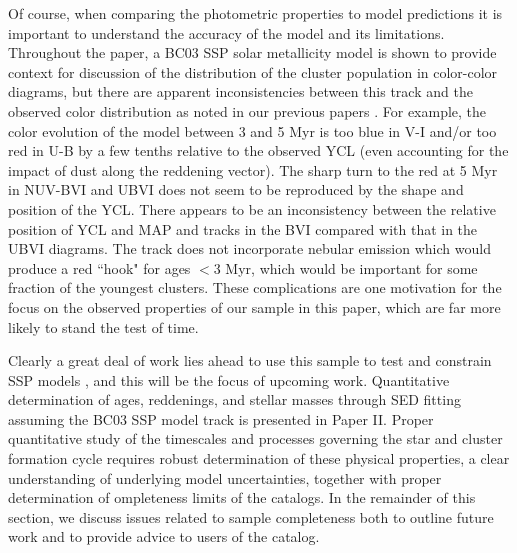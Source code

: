 \documentclass[linenumbers]{aastex63}
\begin{document}
 Of course, when comparing the photometric properties to model predictions it is important to understand the accuracy of the model and its limitations. Throughout the paper, a BC03 SSP solar metallicity model is shown to provide context for discussion of the distribution of the cluster population in color-color diagrams, but there are apparent inconsistencies between this track and the observed color distribution as noted in our previous papers \citep[e.g.,][]{turner_phangs-hst_2021, deger_bright_2022}.  For example, the color evolution of the model between 3 and 5 Myr is too blue in V-I and/or too red in U-B by a few tenths relative to the observed YCL (even accounting for the impact of dust along the reddening vector).  The sharp turn to the red at 5 Myr in NUV-BVI and UBVI does not seem to be reproduced by the shape and position of the YCL.   There appears to be an inconsistency between the relative position of YCL and MAP and tracks in the BVI compared with that in the UBVI diagrams.  The track does not incorporate nebular emission which would produce a red ``hook" for ages $<$3 Myr, which would be important for some fraction of the youngest clusters.  These complications are one motivation for the focus on the observed properties of our sample in this paper, which are far more likely to stand the test of time.

Clearly a great deal of work lies ahead to use this sample to test and constrain SSP models \citep[e.g.,][and references therein]{wofford_comprehensive_2016}, and this will be the focus of upcoming work.  Quantitative determination of ages, reddenings, and stellar masses through SED fitting assuming the BC03 SSP model track is presented in Paper II. Proper quantitative study of the timescales and processes governing the star and cluster formation cycle requires robust determination of these physical properties, a clear understanding of underlying model uncertainties, together with proper determination of  ompleteness limits of the catalogs.  In the remainder of this section, we  discuss issues related to sample completeness both to outline future work and to provide advice to users of the catalog.







\end{document}
